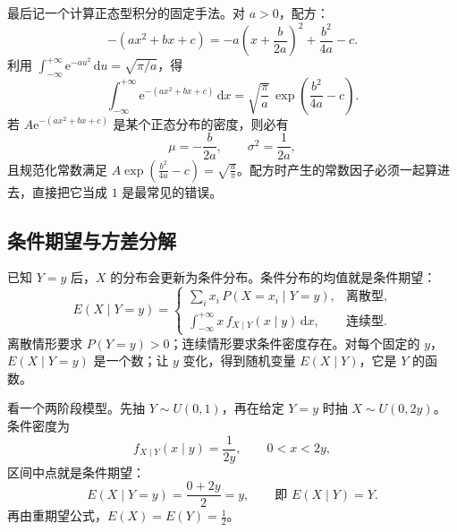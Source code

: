 最后记一个计算正态型积分的固定手法。对 $a>0$，配方：
\[
-(ax^2+bx+c)=-a\left(x+\frac{b}{2a}\right)^2+\frac{b^2}{4a}-c .
\]
利用 $\int_{-\infty}^{+\infty}\mathrm{e}^{-au^2}\,\mathrm{d}u=\sqrt{\pi/a}$，得
\[
\int_{-\infty}^{+\infty}\mathrm{e}^{-(ax^2+bx+c)}\,\mathrm{d}x
=\sqrt{\frac{\pi}{a}}\,
\exp\left(\frac{b^2}{4a}-c\right).
\]
若 $A\mathrm{e}^{-(ax^2+bx+c)}$ 是某个正态分布的密度，则必有
\[
\mu=-\frac{b}{2a},\qquad \sigma^2=\frac{1}{2a},
\]
且规范化常数满足 $A\exp\left(\frac{b^2}{4a}-c\right)=\sqrt{\frac{a}{\pi}}$。配方时产生的常数因子必须一起算进去，直接把它当成 $1$ 是最常见的错误。

\subsection{条件期望与方差分解}

已知 $Y=y$ 后，$X$ 的分布会更新为条件分布。条件分布的均值就是条件期望：
\[
E(X\mid Y=y)=
\begin{cases}
\displaystyle\sum_i x_i\,P(X=x_i\mid Y=y), & \text{离散型},\\[6pt]
\displaystyle\int_{-\infty}^{+\infty}x\,f_{X\mid Y}(x\mid y)\,\mathrm{d}x, & \text{连续型}.
\end{cases}
\]
离散情形要求 $P(Y=y)>0$；连续情形要求条件密度存在。对每个固定的 $y$，$E(X\mid Y=y)$ 是一个数；让 $y$ 变化，得到随机变量 $E(X\mid Y)$，它是 $Y$ 的函数。

看一个两阶段模型。先抽 $Y\sim U(0,1)$，再在给定 $Y=y$ 时抽 $X\sim U(0,2y)$。条件密度为
\[
f_{X\mid Y}(x\mid y)=\frac{1}{2y},\qquad 0<x<2y,
\]
区间中点就是条件期望：
\[
E(X\mid Y=y)=\frac{0+2y}{2}=y,
\qquad\text{即 } E(X\mid Y)=Y .
\]
再由重期望公式，$E(X)=E(Y)=\frac12$。

